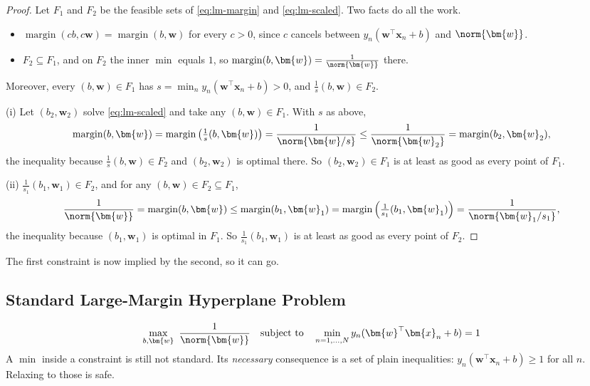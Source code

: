 \begin{proof}
    Let \(F_1\) and \(F_2\) be the feasible sets of \eqref{eq:lm-margin} and
    \eqref{eq:lm-scaled}. Two facts do all the work.
    \begin{itemize}
        \item \(\operatorname{margin}(cb, c\bm{w}) = \operatorname{margin}(b,
            \bm{w})\) for every \(c > 0\), since \(c\) cancels between
            \(y_n (\bm{w}^\top \bm{x}_n + b)\) and \(\norm{\bm{w}}\).
        \item \(F_2 \subseteq F_1\), and on \(F_2\) the inner \(\min\)
            equals \(1\), so \(\operatorname{margin}(b, \bm{w}) =
            \frac{1}{\norm{\bm{w}}}\) there.
    \end{itemize}
    Moreover, every \((b, \bm{w}) \in F_1\) has \(s = \min_n y_n
    (\bm{w}^\top \bm{x}_n + b) > 0\), and \(\frac{1}{s} (b, \bm{w}) \in
    F_2\).

    (i) Let \((b_2, \bm{w}_2)\) solve \eqref{eq:lm-scaled} and take any
    \((b, \bm{w}) \in F_1\). With \(s\) as above,
    \[
        \operatorname{margin}(b, \bm{w}) =
        \operatorname{margin}\left( \tfrac{1}{s} (b, \bm{w}) \right) =
        \frac{1}{\norm{\bm{w} / s}} \le \frac{1}{\norm{\bm{w}_2}} =
        \operatorname{margin}(b_2, \bm{w}_2),
    \]
    the inequality because \(\frac{1}{s} (b, \bm{w}) \in F_2\) and \((b_2,
    \bm{w}_2)\) is optimal there. So \((b_2, \bm{w}_2) \in F_1\) is at least
    as good as every point of \(F_1\).

    (ii) \(\frac{1}{s_1} (b_1, \bm{w}_1) \in F_2\), and for any \((b, \bm{w})
    \in F_2 \subseteq F_1\),
    \[
        \frac{1}{\norm{\bm{w}}} = \operatorname{margin}(b, \bm{w}) \le
        \operatorname{margin}(b_1, \bm{w}_1) =
        \operatorname{margin}\left( \tfrac{1}{s_1} (b_1, \bm{w}_1) \right) =
        \frac{1}{\norm{\bm{w}_1 / s_1}},
    \]
    the inequality because \((b_1, \bm{w}_1)\) is optimal in \(F_1\). So
    \(\frac{1}{s_1} (b_1, \bm{w}_1)\) is at least as good as every point of
    \(F_2\).
\end{proof}

The first constraint is now implied by the second, so it can go.

\subsection{Standard Large-Margin Hyperplane Problem}

\[
    \max_{b, \bm{w}} \ \frac{1}{\norm{\bm{w}}} \quad \text{subject to}
    \quad \min_{n=1,\dots,N} y_n (\bm{w}^\top \bm{x}_n + b) = 1
\]
A \(\min\) inside a constraint is still not standard. Its \emph{necessary}
consequence is a set of plain inequalities: \(y_n (\bm{w}^\top \bm{x}_n + b)
\ge 1\) for all \(n\). Relaxing to those is safe.

